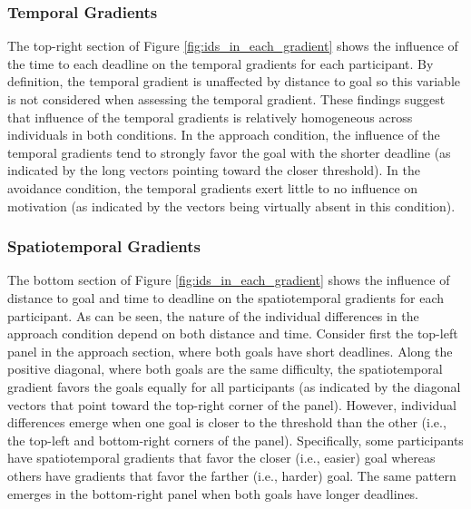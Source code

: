 \documentclass[a4paper,doc,natbib,donotrepeattitle]{apa6}
\begin{document}
\subsubsection{Temporal Gradients}

The top-right section of Figure \ref{fig:ids_in_each_gradient} shows the influence of the time to each deadline on the temporal gradients for each participant. By definition, the temporal gradient is unaffected by distance to goal so this variable is not considered when assessing the temporal gradient. These findings suggest that influence of the temporal gradients is relatively homogeneous across individuals in both conditions. In the approach condition, the influence of the temporal gradients tend to strongly favor the goal with the shorter deadline (as indicated by the long vectors pointing toward the closer threshold). In the avoidance condition, the temporal gradients exert little to no influence on motivation (as indicated by the vectors being virtually absent in this condition).

\subsubsection{Spatiotemporal Gradients}

The bottom section of Figure \ref{fig:ids_in_each_gradient} shows the influence of distance to goal and time to deadline on the spatiotemporal gradients for each participant. As can be seen, the nature of the individual differences in the approach condition depend on both distance and time. Consider first the top-left panel in the approach section, where both goals have short deadlines. Along the positive diagonal, where both goals are the same difficulty, the spatiotemporal gradient favors the goals equally for all participants (as indicated by the diagonal vectors that point toward the top-right corner of the panel). However, individual differences emerge when one goal is closer to the threshold than the other (i.e., the top-left and bottom-right corners of the panel). Specifically, some participants have spatiotemporal gradients that favor the closer (i.e., easier) goal whereas others have gradients that favor the farther (i.e., harder) goal. The same pattern emerges in the bottom-right panel when both goals have longer deadlines.
\end{document}

